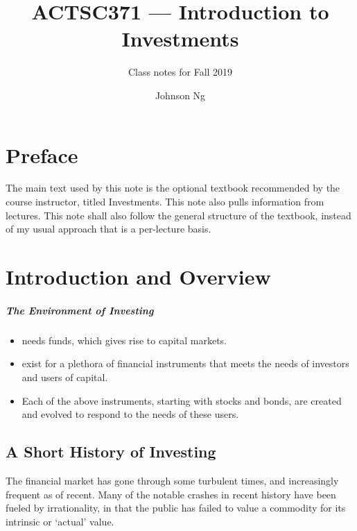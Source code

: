 \documentclass[notoc,notitlepage]{tufte-book}
\title{ACTSC371 --- Introduction to Investments}
\author{Johnson Ng}
\subtitle{Class notes for Fall 2019}
\begin{document}


\chapter*{Preface}%
\label{chp:preface}

The main text used by this note is the optional textbook
recommended by the course instructor, titled Investments.
\cite{bodie2015}
This note also pulls information from lectures.
This note shall also follow the general structure of the textbook,
instead of my usual approach that is a per-lecture basis.


\chapter{Introduction and Overview}%
\label{chp:introduction_and_overview}

\paragraph{The Environment of Investing}\label{paragraph:the_environment_of_investing}

\begin{itemize}
  \item {} needs funds, which gives rise to capital
    markets.
  \item {} exist for a plethora of financial instruments
    that meets the needs of investors and users of capital.
  \item Each of the above instruments, starting with stocks and bonds,
    are created and evolved to respond to the needs of these users.
\end{itemize}

\section{A Short History of Investing}%
\label{sec:a_short_history_of_investing}

The financial market has gone through some turbulent times,
and increasingly frequent as of recent.
Many of the notable crashes in recent history have been fueled
by irrationality, in that the public has failed to value a commodity
for its intrinsic or `actual' value.
\end{document}
